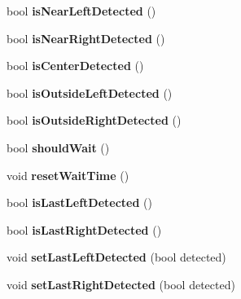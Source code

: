 \begin{DoxyCompactItemize}
\item 
\hypertarget{class_noeud_robot_a80b2c83b5bcca76ab8c5d50967dd9637}{bool {\bfseries is\-Near\-Left\-Detected} ()}\label{class_noeud_robot_a80b2c83b5bcca76ab8c5d50967dd9637}

\item 
\hypertarget{class_noeud_robot_a8d18374cb7ccc6abf7d81e84b5e2895a}{bool {\bfseries is\-Near\-Right\-Detected} ()}\label{class_noeud_robot_a8d18374cb7ccc6abf7d81e84b5e2895a}

\item 
\hypertarget{class_noeud_robot_a009107b9beb4b85c4e45093662259997}{bool {\bfseries is\-Center\-Detected} ()}\label{class_noeud_robot_a009107b9beb4b85c4e45093662259997}

\item 
\hypertarget{class_noeud_robot_a0b353d1b8a72a8bc0c74af495856175c}{bool {\bfseries is\-Outside\-Left\-Detected} ()}\label{class_noeud_robot_a0b353d1b8a72a8bc0c74af495856175c}

\item 
\hypertarget{class_noeud_robot_ada097c4f0d1cff06c4205e057a4ff7b3}{bool {\bfseries is\-Outside\-Right\-Detected} ()}\label{class_noeud_robot_ada097c4f0d1cff06c4205e057a4ff7b3}

\item 
\hypertarget{class_noeud_robot_aeedac936662d73d50a2f436a39387a5c}{bool {\bfseries should\-Wait} ()}\label{class_noeud_robot_aeedac936662d73d50a2f436a39387a5c}

\item 
\hypertarget{class_noeud_robot_a46c46ad4fb320aaf4adb747584e12ca8}{void {\bfseries reset\-Wait\-Time} ()}\label{class_noeud_robot_a46c46ad4fb320aaf4adb747584e12ca8}

\item 
\hypertarget{class_noeud_robot_af19faf1dcf809f0fb5419089f6d5c4c1}{bool {\bfseries is\-Last\-Left\-Detected} ()}\label{class_noeud_robot_af19faf1dcf809f0fb5419089f6d5c4c1}

\item 
\hypertarget{class_noeud_robot_a11213fc3369ed504b62234882935716d}{bool {\bfseries is\-Last\-Right\-Detected} ()}\label{class_noeud_robot_a11213fc3369ed504b62234882935716d}

\item 
\hypertarget{class_noeud_robot_ab8c2a79fe2277ded055e3303ed1493f2}{void {\bfseries set\-Last\-Left\-Detected} (bool detected)}\label{class_noeud_robot_ab8c2a79fe2277ded055e3303ed1493f2}

\item 
\hypertarget{class_noeud_robot_a47e2bec0b719767da186577d4e8cbb4b}{void {\bfseries set\-Last\-Right\-Detected} (bool detected)}\label{class_noeud_robot_a47e2bec0b719767da186577d4e8cbb4b}


\end{DoxyCompactItemize}
